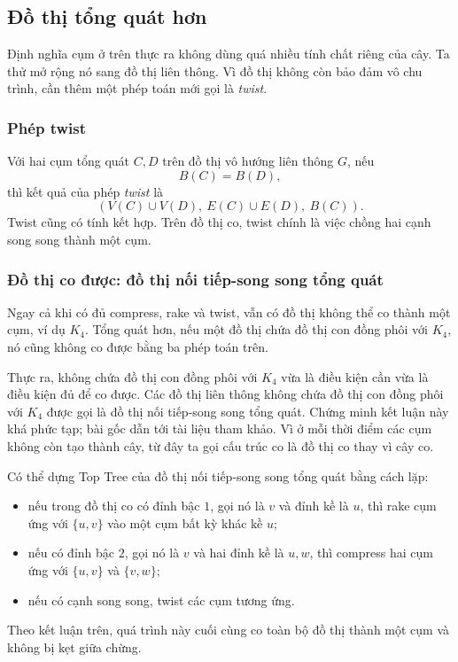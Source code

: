 \documentclass[11pt]{article}
\begin{document}
\subsection{Đồ thị tổng quát hơn}

Định nghĩa cụm ở trên thực ra không dùng quá nhiều tính chất riêng của cây. Ta
thử mở rộng nó sang đồ thị liên thông. Vì đồ thị không còn bảo đảm vô chu trình,
cần thêm một phép toán mới gọi là \emph{twist}.

\subsubsection{Phép twist}

Với hai cụm tổng quát \(C,D\) trên đồ thị vô hướng liên thông \(G\), nếu
\[
  B(C)=B(D),
\]
thì kết quả của phép \emph{twist} là
\[
  (V(C)\cup V(D),\ E(C)\cup E(D),\ B(C)).
\]
Twist cũng có tính kết hợp. Trên đồ thị co, twist chính là việc chồng hai cạnh
song song thành một cụm.

\subsubsection{Đồ thị co được: đồ thị nối tiếp-song song tổng quát}

Ngay cả khi có đủ compress, rake và twist, vẫn có đồ thị không thể co thành
một cụm, ví dụ \(K_4\). Tổng quát hơn, nếu một đồ thị chứa đồ thị con đồng phôi
với \(K_4\), nó cũng không co được bằng ba phép toán trên.

Thực ra, không chứa đồ thị con đồng phôi với \(K_4\) vừa là điều kiện cần vừa
là điều kiện đủ để co được. Các đồ thị liên thông không chứa đồ thị con đồng
phôi với \(K_4\) được gọi là đồ thị nối tiếp-song song tổng quát. Chứng minh
kết luận này khá phức tạp; bài gốc dẫn tới tài liệu tham khảo. Vì ở mỗi thời
điểm các cụm không còn tạo thành cây, từ đây ta gọi cấu trúc co là đồ thị co
thay vì cây co.

Có thể dựng Top Tree của đồ thị nối tiếp-song song tổng quát bằng cách lặp:
\begin{itemize}
  \item nếu trong đồ thị co có đỉnh bậc \(1\), gọi nó là \(v\) và đỉnh kề là
  \(u\), thì rake cụm ứng với \(\{u,v\}\) vào một cụm bất kỳ khác kề \(u\);
  \item nếu có đỉnh bậc \(2\), gọi nó là \(v\) và hai đỉnh kề là \(u,w\), thì
  compress hai cụm ứng với \(\{u,v\}\) và \(\{v,w\}\);
  \item nếu có cạnh song song, twist các cụm tương ứng.
\end{itemize}
Theo kết luận trên, quá trình này cuối cùng co toàn bộ đồ thị thành một cụm và
không bị kẹt giữa chừng.
\end{document}
